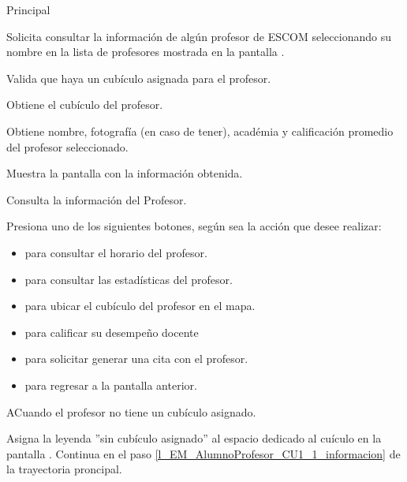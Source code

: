 \begin{UCtrayectoria}{Principal}

	\UCpaso [\UCactor] Solicita consultar la información de algún profesor de ESCOM seleccionando su nombre en la lista de profesores mostrada en la pantalla .

	\UCpaso Valida que haya un cubículo asignada para el profesor.

	\UCpaso Obtiene el cubículo del profesor. 

	\UCpaso Obtiene nombre, fotografía (en caso de tener), académia y calificación promedio del profesor seleccionado. \label{l_EM_AlumnoProfesor_CU1_1_informacion}

	\UCpaso Muestra la pantalla  con la información obtenida.

	\UCpaso[\UCactor] Consulta la información del Profesor.

	\UCpaso [\UCactor] Presiona uno de los siguientes botones, según sea la acción que desee realizar: 
	\begin{itemize}
		\item {} para consultar el horario del profesor.
		\item {} para consultar las estadísticas del profesor.
		\item {} para ubicar el cubículo del profesor en el mapa.
		\item {} para calificar su desempeño docente
		\item {} para solicitar generar una cita con el profesor.
		\item {} para regresar a la pantalla anterior.  
	\end{itemize}

\end{UCtrayectoria}

\begin{UCtrayectoriaA}{A}{Cuando el profesor no tiene un cubículo asignado.}

	\UCpaso	Asigna la leyenda ''sin cubículo asignado'' al espacio dedicado al cuículo en la pantalla .
	\UCpaso Continua en el paso \ref{l_EM_AlumnoProfesor_CU1_1_informacion} de la trayectoria proncipal.

\end{UCtrayectoriaA}



